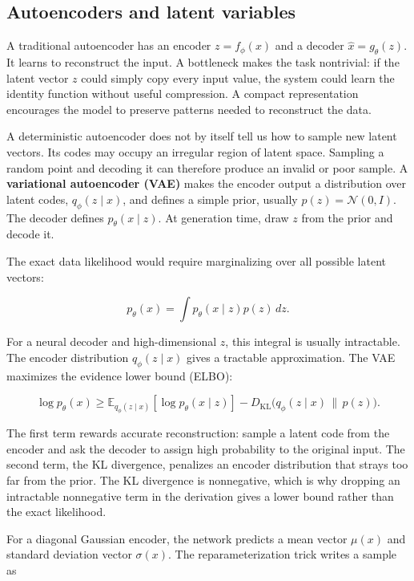\subsection{Autoencoders and latent variables}\label{04-visual-computing-ii-ch031-autoencoders-and-latent-variables}

A traditional autoencoder has an encoder \(z=f_\phi(x)\) and a decoder \(\hat{x}=g_\theta(z)\). It learns to reconstruct the input. A bottleneck makes the task nontrivial: if the latent vector \(z\) could simply copy every input value, the system could learn the identity function without useful compression. A compact representation encourages the model to preserve patterns needed to reconstruct the data.

A deterministic autoencoder does not by itself tell us how to sample new latent vectors. Its codes may occupy an irregular region of latent space. Sampling a random point and decoding it can therefore produce an invalid or poor sample. A \textbf{variational autoencoder (VAE)} makes the encoder output a distribution over latent codes, \(q_\phi(z\mid x)\), and defines a simple prior, usually \(p(z)=\mathcal{N}(0,I)\). The decoder defines \(p_\theta(x\mid z)\). At generation time, draw \(z\) from the prior and decode it.

The exact data likelihood would require marginalizing over all possible latent vectors:

\[
p_\theta(x)=\int p_\theta(x\mid z)p(z)\,dz.
\]

For a neural decoder and high-dimensional \(z\), this integral is usually intractable. The encoder distribution \(q_\phi(z\mid x)\) gives a tractable approximation. The VAE maximizes the evidence lower bound (ELBO):

\[
\log p_\theta(x)\geq
\mathbb{E}_{q_\phi(z\mid x)}[\log p_\theta(x\mid z)]
- D_{\mathrm{KL}}\big(q_\phi(z\mid x)\,\|\,p(z)\big).
\]

The first term rewards accurate reconstruction: sample a latent code from the encoder and ask the decoder to assign high probability to the original input. The second term, the KL divergence, penalizes an encoder distribution that strays too far from the prior. The KL divergence is nonnegative, which is why dropping an intractable nonnegative term in the derivation gives a lower bound rather than the exact likelihood.

For a diagonal Gaussian encoder, the network predicts a mean vector \(\mu(x)\) and standard deviation vector \(\sigma(x)\). The reparameterization trick writes a sample as

